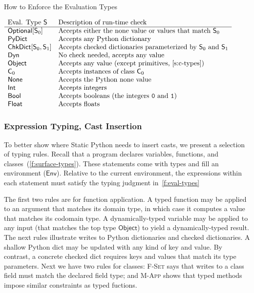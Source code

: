 \documentclass[english,cleveref,submission]{programming}
\newcommand{\SP}{Static Python}
\newcommand{\code}[1]{\texttt{#1}}
\newcommand{\typefont}[1]{\mathsf{#1}}
\newcommand{\paramtype}[2]{#1[#2]}
\newcommand{\spteval}{\typefont{S}}
\newcommand{\sptclass}{\typefont{C}}
\newcommand{\sptint}{\typefont{Int}}
\newcommand{\sptbool}{\typefont{Bool}}
\newcommand{\sptfloat}{\typefont{Float}}
\newcommand{\sptdyn}{\typefont{Dyn}}
\newcommand{\sptobject}{\typefont{Object}}
\newcommand{\sptnone}{\typefont{None}}
\newcommand{\sptoptional}[1]{\paramtype{\typefont{Optional}}{#1}}
\newcommand{\sptrawpydict}{\typefont{PyDict}}
\newcommand{\sptchkdict}[2]{\paramtype{\typefont{ChkDict}}{#1, #2}}
\newcommand{\sptenv}{\typefont{Env}}
\newcommand{\trule}[1]{\textsc{#1}}
\begin{document}
\begin{table}[t]
  \caption{How to Enforce the Evaluation Types}
  \label{t:cast}

  \(\begin{array}{l@{\quad}l}
    \mbox{Eval. Type $\spteval$} & \mbox{Description of run-time check} \\\hline
    \sptoptional{\spteval_0} & \mbox{Accepts either the none value or values that match $\spteval_0$} \\
    \sptrawpydict & \mbox{Accepts any Python dictionary} \\
    \sptchkdict{\spteval_0}{\spteval_1} & \mbox{Accepts checked dictionaries parameterized by $\spteval_0$ and $\spteval_1$} \\
    \sptdyn & \mbox{No check needed, accepts any value} \\
    \sptobject & \mbox{Accepts any value (except primitives,~\cref{s:c-types})} \\
    \sptclass_0 & \mbox{Accepts instances of class $\sptclass_0$} \\
    \sptnone & \mbox{Accepts the Python none value} \\
    \sptint & \mbox{Accepts integers} \\
    \sptbool & \mbox{Accepts booleans (the integers \code{0} and \code{1})} \\
    \sptfloat & \mbox{Accepts floats}
  \end{array}\)
\end{table}


\subsubsection{Expression Typing, Cast Insertion}

To better show where \SP{} needs to insert casts, we present a selection of typing rules.
Recall that a program declares variables, functions, and classes~(\cref{f:surface-types}).
These statements come with types and fill an environment ($\sptenv$).
Relative to the current environment, the expressions within each statement must
satisfy the typing judgment in~\cref{f:eval-types} 

The first two rules are for function application.
A typed function may be applied to an argument that matches its domain type,
in which case it computes a value that matches its codomain type.
A dynamically-typed variable may be applied to any input (that matches the top
type $\sptobject$) to yield a dynamically-typed result.
The next rules illustrate writes to Python dictionaries and checked dictionaries.
A shallow Python dict may be updated with any kind of key and value.
By contrast, a concrete checked dict requires keys and values that match its type parameters.
Next we have two rules for classes:
\trule{F-Set} says that writes to a class field must match the declared field
type; and \trule{M-App} shows that typed methods impose similar constraints as
typed fuctions.
\end{document}
